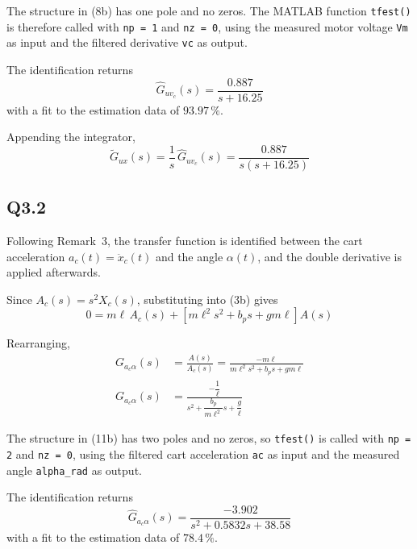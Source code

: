 \documentclass[11pt,a4paper]{article}
\begin{document}
The structure in (8b) has one pole and no zeros. The MATLAB function
\texttt{tfest()} is therefore called with \texttt{np = 1} and \texttt{nz = 0},
using the measured motor voltage \texttt{Vm} as input and the filtered
derivative \texttt{vc} as output.

The identification returns
\begin{equation*}
	\hat{G}_{uv_{c}}(s) = \frac{0.887}{s + 16.25} \tag{9}
\end{equation*}
with a fit to the estimation data of $93.97\,\%$.

Appending the integrator,
\begin{equation*}
	\tilde{G}_{ux}(s) = \frac{1}{s}\,\hat{G}_{uv_{c}}(s)
	= \frac{0.887}{s \left( s + 16.25 \right)} \tag{10}
\end{equation*}

\subsection*{Q3.2}

Following Remark~3, the transfer function is identified between the cart
acceleration $a_{c}(t) = \ddot{x}_{c}(t)$ and the angle $\alpha(t)$, and the
double derivative is applied afterwards.

Since $A_{c}(s) = s^{2} X_{c}(s)$, substituting into (3b) gives
\begin{equation*}
	0 = m \ell\, A_{c}(s)
	+ \left[ m \ell^{2} s^{2} + b_{p} s + g m \ell \right] A(s)
\end{equation*}

Rearranging,
\begin{align*}
	G_{a_{c}\alpha}(s) &= \frac{A(s)}{A_{c}(s)}
	= \frac{-m \ell}{m \ell^{2} s^{2} + b_{p} s + g m \ell} \tag{11a} \\
	G_{a_{c}\alpha}(s) &= \frac{-\dfrac{1}{\ell}}
	{s^{2} + \dfrac{b_{p}}{m \ell^{2}} s + \dfrac{g}{\ell}} \tag{11b}
\end{align*}

The structure in (11b) has two poles and no zeros, so \texttt{tfest()} is
called with \texttt{np = 2} and \texttt{nz = 0}, using the filtered cart
acceleration \texttt{ac} as input and the measured angle \texttt{alpha\_rad}
as output.

The identification returns
\begin{equation*}
	\hat{G}_{a_{c}\alpha}(s) = \frac{-3.902}{s^{2} + 0.5832 s + 38.58}
	\tag{12}
\end{equation*}
with a fit to the estimation data of $78.4\,\%$.
\end{document}
